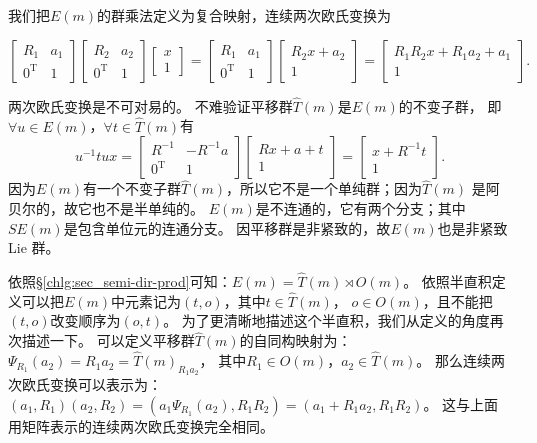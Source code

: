 我们把$E(m)$的群乘法定义为复合映射，连续两次欧氏变换为
\begin{small}

\begin{equation}\label{chlg:eqn_Emtimes}
    \begin{bmatrix}  R_1 & a_1 \\ 0^{\mathrm{T}} & 1  \end{bmatrix}
    \begin{bmatrix}  R_2 & a_2 \\ 0^{\mathrm{T}} & 1  \end{bmatrix}
    \begin{bmatrix}  x \\ 1 \end{bmatrix}
    =\begin{bmatrix}  R_1 & a_1 \\ 0^{\mathrm{T}} & 1  \end{bmatrix}
    \begin{bmatrix}  R_2x + a_2 \\  1  \end{bmatrix}
    =\begin{bmatrix}  R_1 R_2x + R_1 a_2 +a_1 \\  1  \end{bmatrix}.
\end{equation}
\end{small}
两次欧氏变换是不可对易的。
不难验证平移群$\hat{T}(m)$是$E(m)$的不变子群，
即$\forall u \in E(m)$，$\forall t \in \hat{T}(m)$有
\begin{equation}
    u^{-1} t u x=
    \begin{bmatrix}  R^{-1} & -R^{-1} a \\ 0^{\mathrm{T}} & 1    \end{bmatrix}
    \begin{bmatrix}  Rx + a +  t\\  1  \end{bmatrix}
    =\begin{bmatrix} x + R^{-1} t\\  1  \end{bmatrix}.
\end{equation}
因为$E(m)$有一个不变子群$\hat{T}(m)$，所以它不是一个单纯群；因为$\hat{T}(m)$
是阿贝尔的，故它也不是半单纯的。
$E(m)$是不连通的，它有两个分支；其中$SE(m)$是包含单位元的连通分支。
因平移群是非紧致的，故$E(m)$也是非紧致 Lie 群。

依照\S\ref{chlg:sec_semi-dir-prod}可知：$E(m)= \hat{T}(m) \rtimes O(m)$。
依照半直积定义可以把$E(m)$中元素记为$(t,o)$，其中$t\in \hat{T}(m)$，
$o\in O(m)$，且不能把$(t,o)$改变顺序为$(o,t)$。
为了更清晰地描述这个半直积，我们从定义的角度再次描述一下。
可以定义平移群$\hat{T}(m)$的自同构映射为：
$\Psi_{R_1}( a_2)=R_1 a_2 = \hat{T}(m)_{R_1 a_2}$，
其中$R_1 \in O(m)$，$a_2\in \hat{T}(m)$。
那么连续两次欧氏变换可以表示为：
$(a_1, R_1)(a_2, R_2)=(a_1 \Psi_{R_1}( a_2), R_1 R_2)
=(a_1 + R_1 a_2 , R_1 R_2)$。
这与上面用矩阵表示的连续两次欧氏变换完全相同。

